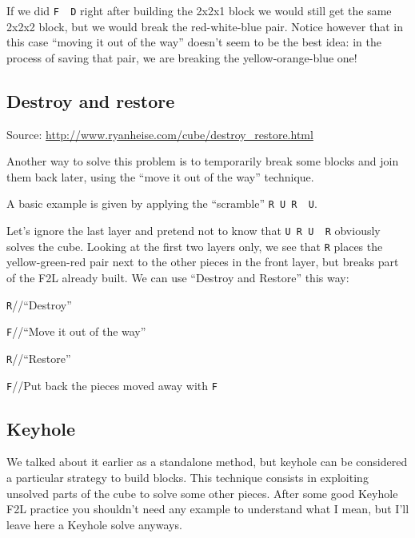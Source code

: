 \documentclass[11pt,a4paper]{book}
\newcommand{\p}{\textquotesingle}
\newcommand{\m}{\texttt}
\newcommand{\ps}{\p\,\,}
\newcommand{\comment}[1]{{\color{gray}\quad//#1}}
\begin{document}
If we did \m{F\ps D\p} right after building the 2x2x1 block we would still get the same 2x2x2 block, but we would break the red-white-blue pair. Notice however that in this case ``moving it out of the way'' doesn't seem to be the best idea: in the process of saving that pair, we are breaking the yellow-orange-blue one!

\subsection{Destroy and restore}

Source: \url{http://www.ryanheise.com/cube/destroy_restore.html}\bigskip

Another way to solve this problem is to temporarily break some blocks and join them back later, using the ``move it out of the way'' technique.

A basic example is given by applying the ``scramble'' \m{R U R\ps U\p}.

\begin{center}

\end{center}

Let's ignore the last layer and pretend not to know that \m{U R U\ps R\p} obviously solves the cube. Looking at the first two layers only, we see that \m{R\p} places the yellow-green-red pair next to the other pieces in the front layer, but breaks part of the F2L already built. We can use “Destroy and Restore” this way:

\bigskip
\m{R\p}\comment{``Destroy''}

\m{F}\comment{``Move it out of the way''}

\m R\comment{``Restore''}

\m{F\p}\comment{Put back the pieces moved away with \m F}

\subsection{Keyhole}

We talked about it earlier as a standalone method, but keyhole can be considered a particular strategy to build blocks. This  technique consists in exploiting unsolved parts of the cube to solve some other pieces. After some good Keyhole F2L practice you shouldn't need any example to understand what I mean, but I'll leave here a Keyhole solve anyways.
\end{document}
